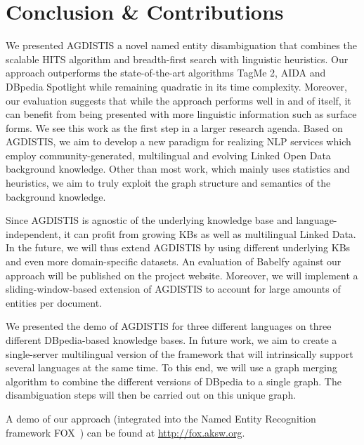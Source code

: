 \section{Conclusion \& Contributions}
\label{sec:conclusion}
We presented AGDISTIS a novel named entity disambiguation that combines the scalable  \ac{HITS} algorithm and breadth-first search with linguistic heuristics.
Our approach outperforms the state-of-the-art algorithms TagMe 2, AIDA and DBpedia Spotlight while remaining quadratic in its time complexity. 
Moreover, our evaluation suggests that while the approach performs well in and of itself, it can benefit from being presented with more linguistic information such as surface forms. 
We see this work as the first step in a larger research agenda.
Based on AGDISTIS, we aim to develop a new paradigm for realizing NLP services which employ community-generated, multilingual and evolving Linked Open Data background knowledge.
Other than most work, which mainly uses statistics and heuristics, we aim to truly exploit the graph structure and semantics of the background knowledge.

Since AGDISTIS is agnostic of the underlying knowledge base and language-independent, it can profit from growing \ac{KB}s as well as multilingual Linked Data.
In the future, we will thus extend AGDISTIS by using different underlying \ac{KB}s and even more domain-specific datasets.
An evaluation of Babelfy against our approach will be published on the project website.
Moreover, we will implement a sliding-window-based extension of AGDISTIS to account for large amounts of entities per document.
%

We presented the demo of AGDISTIS for three different languages on three different DBpedia-based knowledge bases.
In future work, we aim to create a single-server multilingual version of the framework that will intrinsically support several languages at the same time.
To this end, we will use a graph merging algorithm to combine the different versions of DBpedia to a single graph.
The disambiguation steps will then be carried out on this unique graph.


A demo of our approach (integrated into the Named Entity Recognition framework FOX~\cite{FOX}) can be found at \url{http://fox.aksw.org}. 